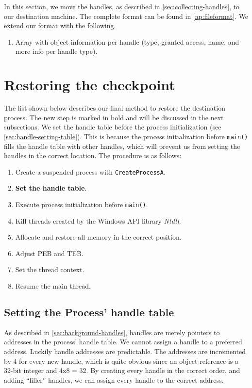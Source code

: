 \documentclass[a4paper, 11pt, english]{report}
\begin{document}
In this section, we move the handles, as described in \autoref{sec:collecting-handles}, to our destination machine. The complete format can be found in \autoref{ap:fileformat}.
We extend our format with the following. 

\begin{enumerate}
	\item Array with object information per handle (type, granted access, name, and more info per handle type).
\end{enumerate}

\section{Restoring the checkpoint}
\label{sec:handles-restoring-checkpoint}

The list shown below describes our final method to restore the destination process.
The new step is marked in bold and will be discussed in the next subsections. We set the handle table before the process initialization (see \autoref{sec:handle-setting-table}). This is because the process initialization before \texttt{main()} fills the handle table with other handles, which will prevent us from setting the handles in the correct location. The procedure is as follows:

\begin{enumerate}
	\item Create a suspended process with \texttt{CreateProcessA}.
	\item \textbf{Set the handle table}.
	\item Execute process initialization before \texttt{main()}.
	\item Kill threads created by the Windows API library \textit{Ntdll}.
	\item Allocate and restore all memory in the correct position.
	\item Adjust PEB and TEB.
	\item Set the thread context.
	\item Resume the main thread.
\end{enumerate}

\subsection{Setting the Process' handle table}
\label{sec:handle-setting-table}
As described in \autoref{sec:background-handles}, handles are merely pointers to addresses in the process' handle table.
We cannot assign a handle to a preferred address.
Luckily handle addresses are predictable. The addresses are incremented by 4 for every new handle, which is quite obvious since an object reference is a 32-bit integer and 4x8 = 32.
By creating every handle in the correct order, and adding ``filler'' handles, we can assign every handle to the correct address.
\end{document}
